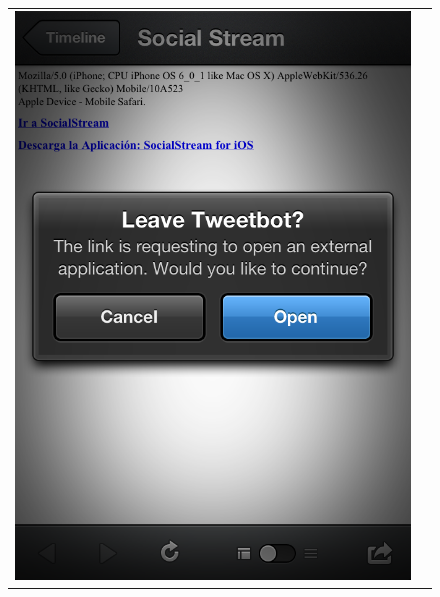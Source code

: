 \begin{figure}[H]
	\centering
	\begin{tabular}{cc}
	\includegraphics[scale=0.3]{imgs/tweetbot-sstream.png} &

\end{tabular}
\end{figure}
